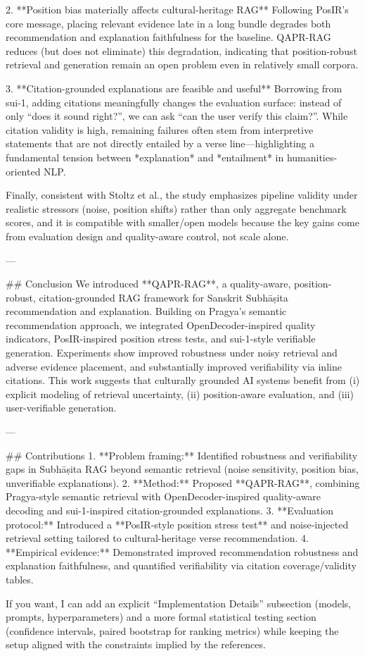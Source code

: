 2. **Position bias materially affects cultural-heritage RAG**  
Following PosIR’s core message, placing relevant evidence late in a long bundle degrades both recommendation and explanation faithfulness for the baseline. QAPR-RAG reduces (but does not eliminate) this degradation, indicating that position-robust retrieval and generation remain an open problem even in relatively small corpora.

3. **Citation-grounded explanations are feasible and useful**  
Borrowing from sui-1, adding citations meaningfully changes the evaluation surface: instead of only “does it sound right?”, we can ask “can the user verify this claim?”. While citation validity is high, remaining failures often stem from interpretive statements that are not directly entailed by a verse line—highlighting a fundamental tension between *explanation* and *entailment* in humanities-oriented NLP.

Finally, consistent with Stoltz et al., the study emphasizes pipeline validity under realistic stressors (noise, position shifts) rather than only aggregate benchmark scores, and it is compatible with smaller/open models because the key gains come from evaluation design and quality-aware control, not scale alone.

---

## Conclusion  
We introduced **QAPR-RAG**, a quality-aware, position-robust, citation-grounded RAG framework for Sanskrit Subhāṣita recommendation and explanation. Building on Pragya’s semantic recommendation approach, we integrated OpenDecoder-inspired quality indicators, PosIR-inspired position stress tests, and sui-1-style verifiable generation. Experiments show improved robustness under noisy retrieval and adverse evidence placement, and substantially improved verifiability via inline citations. This work suggests that culturally grounded AI systems benefit from (i) explicit modeling of retrieval uncertainty, (ii) position-aware evaluation, and (iii) user-verifiable generation.

---

## Contributions  
1. **Problem framing:** Identified robustness and verifiability gaps in Subhāṣita RAG beyond semantic retrieval (noise sensitivity, position bias, unverifiable explanations).  
2. **Method:** Proposed **QAPR-RAG**, combining Pragya-style semantic retrieval with OpenDecoder-inspired quality-aware decoding and sui-1-inspired citation-grounded explanations.  
3. **Evaluation protocol:** Introduced a **PosIR-style position stress test** and noise-injected retrieval setting tailored to cultural-heritage verse recommendation.  
4. **Empirical evidence:** Demonstrated improved recommendation robustness and explanation faithfulness, and quantified verifiability via citation coverage/validity tables.  

If you want, I can add an explicit “Implementation Details” subsection (models, prompts, hyperparameters) and a more formal statistical testing section (confidence intervals, paired bootstrap for ranking metrics) while keeping the setup aligned with the constraints implied by the references.
